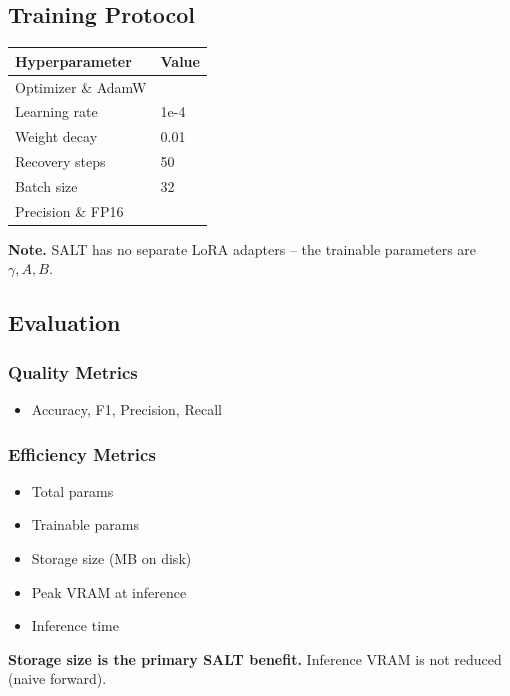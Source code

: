\subsection{Training Protocol}

\begin{table}[H]
\centering
\small
\begin{tabular}{ll}
\toprule
\textbf{Hyperparameter} & \textbf{Value} \\
\midrule
Optimizer \& AdamW \\
Learning rate & 1e-4 \\
Weight decay & 0.01 \\
Recovery steps & 50 \\
Batch size & 32 \\
Precision \& FP16 \\
\bottomrule
\end{tabular}
\end{table}

\textbf{Note.} SALT has no separate LoRA adapters -- the trainable parameters are 
$\gamma, A, B$.

\subsection{Evaluation}

\subsubsection{Quality Metrics}

\begin{itemize}
\item Accuracy, F1, Precision, Recall

\end{itemize}
\subsubsection{Efficiency Metrics}

\begin{itemize}
\item Total params
\item Trainable params
\item Storage size (MB on disk)
\item Peak VRAM at inference
\item Inference time

\end{itemize}
\textbf{Storage size is the primary SALT benefit.} Inference VRAM is not reduced 
(naive forward).

